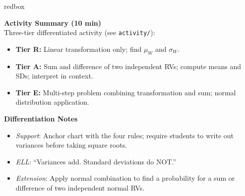 \documentclass[10pt]{article}
\begin{document}
\begin{skillbox}{redbox}
\begin{minipage}[t]{0.48\linewidth}
    \textbf{Activity Summary (10 min)}\\
    Three-tier differentiated activity (see \texttt{activity/}):
    \begin{itemize}
        \item \textbf{Tier R:} Linear transformation only; find $\mu_W$ and $\sigma_W$.
        \item \textbf{Tier A:} Sum and difference of two independent RVs; compute means
              and SDs; interpret in context.
        \item \textbf{Tier E:} Multi-step problem combining transformation and sum;
              normal distribution application.
    \end{itemize}
\end{minipage}
\hfill
\begin{minipage}[t]{0.48\linewidth}
    \textbf{Differentiation Notes}
    \begin{itemize}
        \item \textit{Support}: Anchor chart with the four rules; require students to
              write out variances before taking square roots.
        \item \textit{ELL}: ``Variances add. Standard deviations do NOT.''
        \item \textit{Extension}: Apply normal combination to find a probability for a
              sum or difference of two independent normal RVs.
    \end{itemize}
\end{minipage}
\end{skillbox}
\end{document}
